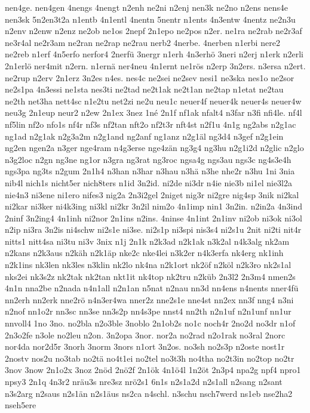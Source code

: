 {nen4ge.
nen4gen
4nengs
4nengt
n2enh
ne2ni
n2enj
nen3k
ne2no
n2ens
nens4e
nen3sk
5n2en3t2a
n1entb
4n1entl
4nentn
5nentr
n1ents
4n3entw
4nentz
ne2n3u
n2env
n2enw
n2enz
ne2ob
ne1os
2nepf
2n1epo
ne2pos
n2er.
ne1ra
ne2rab
ne2r3af
ne3r4al
ne2r3am
ne2ran
ne2rap
ne2rau
nerb2
4nerbe.
4nerben
n1erbi
nere2
ne2reb
n1erf
4n5erfo
nerfor4
2nerfü
3nergr
n1erh
4n3erhö
3neri
n2erj
n1erk
n2erli
2n1erlö
ner4mit
n2ern.
n1ernä
ner4neu
4n1ernt
ne1rös
n2erp
3n2ers.
n3ersa
n2ert.
ne2rup
n2erv
2n1erz
3n2es
n4es.
nes4c
ne2sei
ne2sev
nesi1
ne3ska
nes1o
ne2sor
ne2s1pa
4n3essi
ne1sta
nes3ti
ne2tad
ne2t1ak
ne2t1an
ne2tap
n1etat
ne2tau
ne2th
net3ha
nett4sc
n1e2tu
net2zi
ne2u
neu1c
neuer4f
neuer4k
neuer4s
neuer4w
neu3g
2n1eup
neur2
n2ew
2n1ex
3nez
1né
2n1f
nf1ak
nfalt4
n3far
n3fi
nfi4le.
nf4l
nf5lin
nf2o
nfo1s
nf4r
nf3s
nf2tan
nft2o
nf2t3r
nft4st
n2f1u
4n1g
ng2abs
n2g1ac
ng1ad
n2g1ak
n2g3a2m
n2g1and
ng2anf
ng1anz
n2g1äl
ng3d4
n3gef
n2g1ein
ng2en
ngen2a
n3ger
nge4ram
n4g3erse
nge4zän
ng3g4
ng3hu
n2g1i2d
n2glic
n2glo
n3g2loc
n2gn
ng3ne
ng1or
n3gra
ng3rat
ng3roc
ngsa4g
ngs3au
ngs3c
ng4s3e4h
ngs3pa
ng3ts
n2gum
2n1h4
n3han
n3har
n3hau
n3hä
n3he
nhe2r
n3hu
1ni
3nia
nib4l
nich1s
nicht5er
nich8ters
n1id
3n2id.
ni2de
ni3dr
n4ie
nie3b
ni1el
nie3l2a
nie4n3
ni3ene
ni1ero
nifes3
nig2a
2n3i2gel
2niget
nig3r
ni2gre
nig4sp
3nik
ni2kal
ni2kar
ni3ker
ni4k3ing
ni3kl
ni2kr
3n2il
nim2o
4n1imp
nin1
3n2in.
n2in2a
4n3ind
2ninf
3n2ing4
4n1inh
ni2nor
2n1ins
n2ins.
4ninse
4n1int
2n1inv
ni2ob
ni3ok
ni3ol
n2ip
ni3ra
3n2is
ni4schw
ni2s1e
ni3se.
ni2s1p
ni3spi
nis3s4
ni2s1u
2nit
ni2ti
nit4r
nitts1
nitt4sa
ni3tu
ni3v
3nix
n1j
2n1k
n2k3ad
n2k1ak
n3k2al
n4k3alg
nk2am
n2kans
n2k3aus
n2käh
n2k1äp
nke2c
nke4lei
n3k2er
n4k3erfa
nk4erg
nk1inh
n2k1ins
nk3len
nk3les
n3klin
nk2lo
nk4na
n2k1ort
nk2öf
n2köl
n2k3ro
nk2s1al
nks2ei
nk3s2z
nk2tak
nk2tan
nkt1it
nk4top
nk2tru
n2küb
2n3l2
2n3m4
nmen2s
4n1n
nna2be
n2nada
n4n1all
n2n1an
n5nat
n2nau
nn3d
nn4ens
n4nents
nner4fü
nn2erh
nn2erk
nne2rö
n4n3er4wa
nner2z
nne2s1e
nne4st
nn2ex
nn3f
nng4
n3ni
n2nof
nn1o2r
nn3sc
nn3se
nn3s2p
nn4s3pe
nnst4
nn2th
n2n1uf
n2n1unf
nn1ur
nnvoll4
1no
3no.
no2bla
n2o3ble
3noblo
2n1ob2s
no1c
noch4r
2no2d
no3dr
n1of
2n3o2fe
n3ole
no2leu
n2on.
3n2opa
3nor.
nor2a
no2rad
n2o1rak
no3ral
2norc
nor4da
nor2d5r
3norh
3norm
3nors
n1ort
3n2os.
no3sh
no2s3p
n2oste
nost1r
2nostv
nos2u
no3tab
no2tä
no4t1ei
no2tel
no3t3h
no4tha
no2t3in
no2top
no2tr
3nov
3now
2n1o2x
3noz
2nöd
2nö2f
2n1ök
4n1ö4l
1n2öt
2n3p4
npa2g
npf4
npro1
npsy3
2n1q
4n3r2
nräu3s
nre3sz
nrö2s1
6n1s
n2s1a2d
n2s1all
n2sang
n2sant
n3s2arg
n2saus
n2s1än
n2s1äus
ns2ca
n4schl.
n3schu
nsch7werd
ns1eb
nse2ha2
nseh5ere
}
